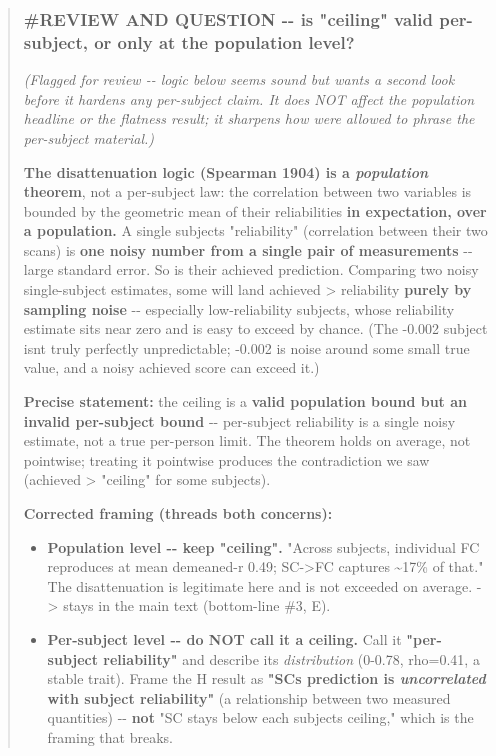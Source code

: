 \begin{quote}
\subsubsection{\texorpdfstring{\#\textbf{REVIEW AND QUESTION} -\/- is "ceiling" valid per-subject, or only at the population level?}{\#REVIEW AND QUESTION -\/- is "ceiling" valid per-subject, or only at the population level?}}\label{review-and-question----is-ceiling-valid-per-subject-or-only-at-the-population-level}

\emph{(Flagged for review -\/- logic below seems sound but wants a second look before it hardens any per-subject claim. It does NOT affect the population headline or the flatness result; it sharpens how we\textquotesingle re allowed to phrase the per-subject material.)}

\textbf{The disattenuation logic (Spearman 1904) is a \emph{population} theorem}, not a per-subject law: the correlation between two variables is bounded by the geometric mean of their reliabilities \textbf{in expectation, over a population.} A single subject\textquotesingle s "reliability" (correlation between their two scans) is \textbf{one noisy number from a single pair of measurements} -\/- large standard error. So is their achieved prediction. Comparing two noisy single-subject estimates, some will land achieved \textgreater{} reliability \textbf{purely by sampling noise} -\/- especially low-reliability subjects, whose reliability estimate sits near zero and is easy to exceed by chance. (The -0.002 subject isn\textquotesingle t truly perfectly unpredictable; -0.002 is noise around some small true value, and a noisy achieved score can exceed it.)

\textbf{Precise statement:} the ceiling is a \textbf{valid population bound but an invalid per-subject bound} -\/- per-subject reliability is a single noisy estimate, not a true per-person limit. The theorem holds on average, not pointwise; treating it pointwise produces the contradiction we saw (achieved \textgreater{} "ceiling" for some subjects).

\textbf{Corrected framing (threads both concerns):}

\begin{itemize}
\tightlist
\item
  \textbf{Population level -\/- keep "ceiling".} "Across subjects, individual FC reproduces at mean demeaned-r 0.49; SC-\textgreater FC captures \textasciitilde17\% of that." The disattenuation is legitimate here and is not exceeded on average. -\textgreater{} stays in the main text (bottom-line \#3, E).
\item
  \textbf{Per-subject level -\/- do NOT call it a ceiling.} Call it \textbf{"per-subject reliability"} and describe its \emph{distribution} (0-0.78, rho=0.41, a stable trait). Frame the H result as \textbf{"SC\textquotesingle s prediction is \emph{uncorrelated} with subject reliability"} (a relationship between two measured quantities) -\/- \textbf{not} "SC stays below each subject\textquotesingle s ceiling," which is the framing that breaks.
\end{itemize}


\end{quote}
